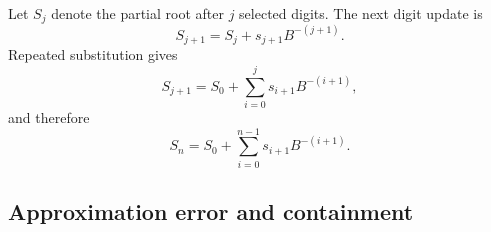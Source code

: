 \documentclass[11pt]{article}
\numberwithin{equation}{section}
\begin{document}
Let $S_j$ denote the partial root after $j$ selected digits.
The next digit update is
\begin{equation}
  \label{eq:sqrt:root_recurrence}
  S_{j+1} = S_j + s_{j+1}B^{-(j+1)}.
\end{equation}
Repeated substitution gives
\begin{equation}
  \label{eq:sqrt:root_unfolded}
  S_{j+1} = S_0 + \sum_{i=0}^{j} s_{i+1}B^{-(i+1)},
\end{equation}
and therefore
\begin{equation}
  \label{eq:sqrt:root_final}
  S_n = S_0 + \sum_{i=0}^{n-1} s_{i+1}B^{-(i+1)}.
\end{equation}

\subsection{Approximation error and containment}
\label{ssec:sqrt:error_and_containment}
\end{document}
